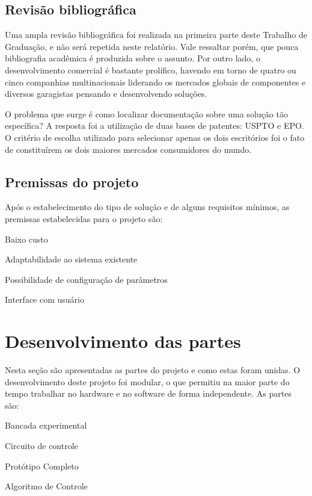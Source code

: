 \documentclass[a4paper,11pt]{article}
\begin{document}
\subsection{Revisão bibliográfica}
Uma ampla revisão bibliográfica foi realizada na primeira parte deste Trabalho
de Graduação, e não será repetida neste relatório. Vale ressaltar porém, que
pouca bibliografia acadêmica é produzida sobre o assunto. Por outro lado, o
desenvolvimento comercial é bastante prolífico, havendo em torno de quatro ou
cinco companhias multinacionais liderando os mercados globais de componentes e
diversos garagistas pensando e desenvolvendo soluções.

O problema que surge é como localizar documentação sobre uma solução tão
específica? A resposta foi a utilização de duas bases de patentes:
USPTO\cite{uspto} e EPO\cite{epo}. O critério de escolha utilizado para
selecionar apenas os dois escritórios foi o fato de constituírem os dois maiores
mercados consumidores do mundo.


\subsection{Premissas do projeto}
Após o estabelecimento do tipo de solução e de alguns requisitos mínimos, as
premissas estabelecidas para o projeto são:
\begin{itemize*}
  \item Baixo custo
  \item Adaptabilidade ao sistema existente
  \item Possibilidade de configuração de parâmetros
  \item Interface com usuário
\end{itemize*}



\pagebreak
%
\section{Desenvolvimento das partes}
\label{sec:partes}
Nesta seção são apresentadas as partes do projeto e como estas foram unidas. O
desenvolvimento deste projeto foi modular, o que permitiu na maior parte do
tempo trabalhar no hardware e no software de forma independente. As partes são:
\begin{itemize*}
  \item Bancada experimental
  \item Circuito de controle
  \item Protótipo Completo
  \item Algoritmo de Controle
\end{itemize*}
\end{document}

